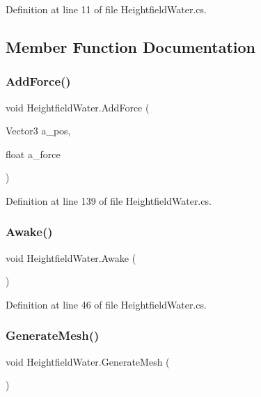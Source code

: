 Definition at line 11 of file Heightfield\+Water.\+cs.



\subsection{Member Function Documentation}
\mbox{\label{class_heightfield_water_a94779279bbfc71272e80cd4e3d258b12}} 
\subsubsection{\texorpdfstring{Add\+Force()}{AddForce()}}
{\footnotesize\ttfamily void Heightfield\+Water.\+Add\+Force (\begin{DoxyParamCaption}\item[{Vector3}]{a\+\_\+pos,  }\item[{float}]{a\+\_\+force }\end{DoxyParamCaption})}



Definition at line 139 of file Heightfield\+Water.\+cs.

\mbox{\label{class_heightfield_water_a33ef9ac32019943dda4367a4f46c9813}} 
\subsubsection{\texorpdfstring{Awake()}{Awake()}}
{\footnotesize\ttfamily void Heightfield\+Water.\+Awake (\begin{DoxyParamCaption}{ }\end{DoxyParamCaption})}



Definition at line 46 of file Heightfield\+Water.\+cs.

\mbox{\label{class_heightfield_water_a5cf2fe5311c065073a9903058d0dc8ef}} 
\subsubsection{\texorpdfstring{Generate\+Mesh()}{GenerateMesh()}}
{\footnotesize\ttfamily void Heightfield\+Water.\+Generate\+Mesh (\begin{DoxyParamCaption}{ }\end{DoxyParamCaption})}



